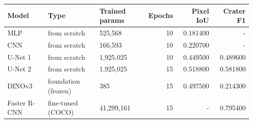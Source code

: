 \begin{tabular}{lllrrr}
\toprule
Model & Type & Trained params & Epochs & Pixel IoU & Crater F1 \\
\midrule
MLP & from scratch & 525,568 & 10 & 0.181400 & - \\
CNN & from scratch & 166,593 & 10 & 0.220700 & - \\
U-Net 1 & from scratch & 1,925,025 & 10 & 0.449500 & 0.489600 \\
U-Net 2 & from scratch & 1,925,025 & 15 & 0.518800 & 0.581800 \\
DINOv3 & foundation (frozen) & 385 & 15 & 0.497500 & 0.214300 \\
Faster R-CNN & fine-tuned (COCO) & 41,299,161 & 15 & - & 0.795400 \\
\bottomrule
\end{tabular}
